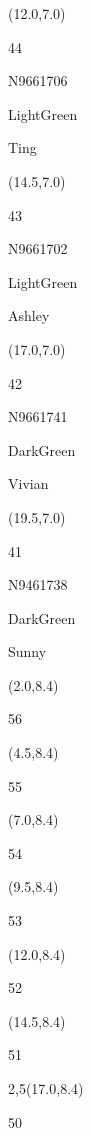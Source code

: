 \documentclass[a4paper]{article}
\newcommand{\myseat}[4]{%
\vspace{-0.1cm} \hspace{-0.5cm}
\parbox[t][2.2cm][t]{3.5cm}{%
\small #1 %
\begin{description}
\vspace{-0.1cm}
\item [ID:] #2
\vspace{-0.1cm}
\item [Team:] #3 \normalsize
\vspace{-0.1cm}
\item \normalsize #4
\vspace{-0.1cm}
\end{description}
}
}
\begin{document}
\begin{textblock}{2.5}(12.0,7.0)
\myseat{44}{N9661706}{LightGreen}{Ting}
\end{textblock}

\begin{textblock}{2.5}(14.5,7.0)
\myseat{43}{N9661702}{LightGreen}{Ashley}
\end{textblock}

\begin{textblock}{2.5}(17.0,7.0)
\myseat{42}{N9661741}{DarkGreen}{Vivian}
\end{textblock}

\begin{textblock}{2.5}(19.5,7.0)
\myseat{41}{N9461738}{DarkGreen}{Sunny}
\end{textblock}


\begin{textblock}{2.5}(2.0,8.4)
\textblockcolor{}
\myseat{56}{}{}{}
\end{textblock}

\begin{textblock}{2.5}(4.5,8.4)
\textblockcolor{}
\myseat{55}{}{}{}
\end{textblock}

\begin{textblock}{2.5}(7.0,8.4)
\textblockcolor{}
\myseat{54}{}{}{}
\end{textblock}

\begin{textblock}{2.5}(9.5,8.4)
\textblockcolor{}
\myseat{53}{}{}{}
\end{textblock}

\begin{textblock}{2.5}(12.0,8.4)
\textblockcolor{}
\myseat{52}{}{}{}
\end{textblock}

\begin{textblock}{2.5}(14.5,8.4)
\textblockcolor{}
\myseat{51}{}{}{}
\end{textblock}

\begin{textblock}{2,5}(17.0,8.4)
\textblockcolor{}
\myseat{50}{}{}{}
\end{textblock}
\end{document}

